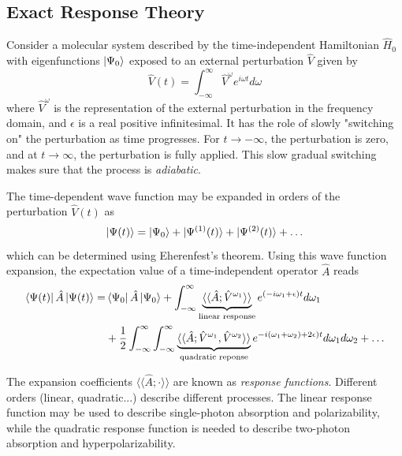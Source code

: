 \subsection{Exact Response Theory}

Consider a molecular system described by the time-independent Hamiltonian $\hat{H}_0$ with eigenfunctions $\ket{\Psi_0}$ exposed to
an external perturbation $\hat{V}$ given by \cite{Koc1990}
\begin{equation}
\hat{V}(t) = \int_{-\infty}^{\infty} \hat{V}^{\omega} e^{i\omega t  } d\omega
\end{equation}
\noindent where $\hat{V}^{\omega}$ is the representation of the external perturbation in the frequency domain, and $\epsilon$ is a real positive infinitesimal. It has the role of slowly "switching on" the perturbation as time progresses. For $t\rightarrow -\infty$, the perturbation is zero, and at $t \rightarrow \infty$, the perturbation is fully applied. This slow gradual switching makes sure that the process is \emph{adiabatic}.

The time-dependent wave function may be expanded in orders of the perturbation $\hat{V}(t)$ as
\begin{equation}
\ket{\smash{\Psi (t)}} = \ket{\smash{\Psi_0}} + \ket{\smash{\Psi^{(1)}(t)}} + \ket{\smash{\Psi^{(2)}(t)}} + \ldots
\end{equation}
\noindent which can be determined using Eherenfest's theorem. Using this wave function expansion, the expectation value of a time-independent operator $\hat{A}$ reads
\begin{equation}
\begin{split}
\bra{\smash{\Psi (t)}} \hat{A} \ket{\smash{\Psi (t)}} = & \bra{\smash{\Psi_0}} \hat{A} \ket{\smash{\Psi_0}} + \int_{-\infty}^{\infty} 
\underbrace{ \langle\langle \hat{A}; \hat{V}^{\omega_1}
\rangle\rangle}_{\text{linear response}} 
e^{(-i\omega_1 + \epsilon)t} d\omega_1 \\
&+ \frac{1}{2} \int_{-\infty}^{\infty} \int_{-\infty}^{\infty}
\underbrace{ \langle\langle \hat{A}; \hat{V}^{\omega_1},\hat{V}^{\omega_2} \rangle\rangle 
}_{\text{quadratic reponse}}
e^{-i(\omega_1+\omega_2) + 2\epsilon)t} d\omega_1 d\omega_2  + \ldots
\end{split}
\label{eq:TIMEEXP}
\end{equation}

\noindent The expansion coefficients $\langle\langle \hat{A}; \cdot \rangle\rangle$ are known as \emph{response functions}. Different orders (linear, quadratic...) describe different processes. The linear response function may be used to describe single-photon absorption and polarizability, while the quadratic response function is needed to describe two-photon absorption and hyperpolarizability. 

